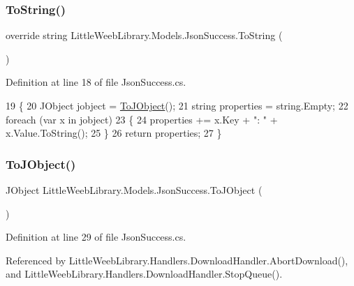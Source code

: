 \subsubsection{\texorpdfstring{To\+String()}{ToString()}}
{\footnotesize\ttfamily override string Little\+Weeb\+Library.\+Models.\+Json\+Success.\+To\+String (\begin{DoxyParamCaption}{ }\end{DoxyParamCaption})}



Definition at line 18 of file Json\+Success.\+cs.


\begin{DoxyCode}
19         \{
20             JObject jobject = \mbox{\hyperlink{class_little_weeb_library_1_1_models_1_1_json_success_aa0e750a34606497266e5a4aedc03cdeb}{ToJObject}}();
21             \textcolor{keywordtype}{string} properties = \textcolor{keywordtype}{string}.Empty;
22             \textcolor{keywordflow}{foreach} (var x \textcolor{keywordflow}{in} jobject)
23             \{
24                 properties += x.Key + \textcolor{stringliteral}{": "} + x.Value.ToString();
25             \}
26             \textcolor{keywordflow}{return} properties;
27         \}
\end{DoxyCode}
\mbox{\label{class_little_weeb_library_1_1_models_1_1_json_success_aa0e750a34606497266e5a4aedc03cdeb}} 
\subsubsection{\texorpdfstring{To\+J\+Object()}{ToJObject()}}
{\footnotesize\ttfamily J\+Object Little\+Weeb\+Library.\+Models.\+Json\+Success.\+To\+J\+Object (\begin{DoxyParamCaption}{ }\end{DoxyParamCaption})}



Definition at line 29 of file Json\+Success.\+cs.



Referenced by Little\+Weeb\+Library.\+Handlers.\+Download\+Handler.\+Abort\+Download(), and Little\+Weeb\+Library.\+Handlers.\+Download\+Handler.\+Stop\+Queue().


